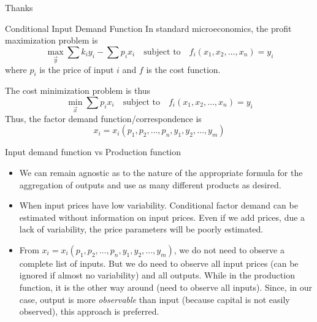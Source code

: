 \documentclass[10pt, aspectratio=169]{beamer}
\begin{document}
{
\begin{frame}[standout]
  Thanks
\end{frame}
}


\appendix

\begin{frame}[label=inputdemand]{Conditional Input Demand Function}
  In standard microeconomics, the profit maximization problem is
  \begin{equation*}
    \max_{\vec{y}} \sum k_i y_i - \sum p_i x_i \quad \text{subject to} \quad f_i(x_1, x_2, \ldots, x_n) = y_i
  \end{equation*}
  where $p_i$ is the price of input $i$ and $f$ is the cost function.

  The cost minimization problem is thus
  \begin{equation*}
    \min_{\vec{x}} \sum p_i x_i \quad \text{subject to} \quad f_i(x_1, x_2, \ldots, x_n) = y_i
  \end{equation*}
  Thus, the factor demand function/correspondence is
  \begin{equation*}
    x_i = x_i(p_1, p_2, \ldots, p_n, y_1, y_2, \ldots, y_m)
  \end{equation*}
  \hyperlink{literature}{}
\end{frame}

\begin{frame}[label=production]{Input demand function vs Production function}
  \begin{itemize}
    \item We can remain agnostic as to the nature of the appropriate formula for the
          aggregation of outputs and use as many different products as desired.
    \item When input prices have low variability. Conditional factor demand can be
          estimated without information on input prices. Even if we add prices, due a
          lack of variability, the price parameters will be poorly estimated.

    \item From $x_i = x_i(p_1, p_2, \ldots, p_n, y_1, y_2, \ldots, y_m)$, we do not need
          to observe a complete list of inputs. But we do need to observe all input
          prices (can be ignored if almost no variability) and all outputs. While in the
          production function, it is the other way around (need to observe all inputs).
          Since, in our case, output is more \textit{observable} than input (because
          capital is not easily observed), this approach is preferred.
  \end{itemize}
\end{frame}
\end{document}
